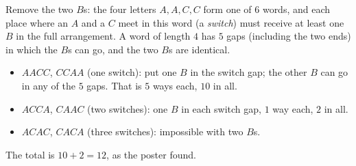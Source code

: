 Remove the two $B$s: the four letters $A,A,C,C$ form one of $6$ words, and each place where an $A$ and a $C$ meet in this word (a \emph{switch}) must receive at least one $B$ in the full arrangement. A word of length $4$ has $5$ gaps (including the two ends) in which the $B$s can go, and the two $B$s are identical.
\begin{itemize}
\item $AACC$, $CCAA$ (one switch): put one $B$ in the switch gap; the other $B$ can go in any of the $5$ gaps. That is $5$ ways each, $10$ in all.
\item $ACCA$, $CAAC$ (two switches): one $B$ in each switch gap, $1$ way each, $2$ in all.
\item $ACAC$, $CACA$ (three switches): impossible with two $B$s.
\end{itemize}
The total is $10+2=\boxed{12}$, as the poster found.
